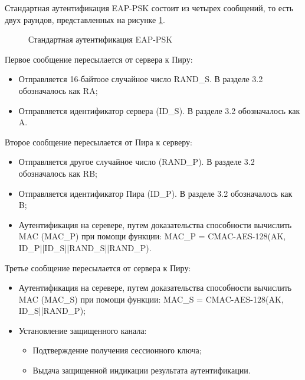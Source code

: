 Стандартная аутентификация EAP-PSK состоит из четырех сообщений, то есть двух раундов, представленных на рисунке \ref{img:standart_aut}.

\begin{figure}[h!]
\caption{Стандартная аутентификация EAP-PSK}
\label{img:standart_aut}
\end{figure}

Первое сообщение пересылается от сервера к Пиру:

\begin{itemize}
\item Отправляется 16-байтоое случайное число RAND\_S. В разделе 3.2 обозначалось как RA;
\item Отправляется идентификатор сервера (ID\_S). В разделе 3.2 обозначалось как A.
\end{itemize}

Второе сообщение пересылается от Пира к серверу:

\begin{itemize}
\item Отправляется другое случайное число (RAND\_P). В разделе 3.2 обозначалось как RB;
\item Отправляется идентификатор Пира (ID\_P). В разделе 3.2 обозначалось как B;
\item Аутентификация на серевере, путем доказательства способности вычислить MAC (MAC\_P) при помощи функции: MAC\_P = CMAC-AES-128(AK, ID\_P||ID\_S||RAND\_S||RAND\_P).
\end{itemize}

Третье сообщение пересылается от сервера к Пиру:

\begin{itemize}
\item Аутентификация на серевере, путем доказательства способности вычислить MAC (MAC\_S) при помощи функции: MAC\_S = CMAC-AES-128(AK, ID\_S||RAND\_P);
\item Установление защищенного канала:
\begin{itemize}
\item Подтверждение получения сессионного ключа;
\item Выдача защищенной индикации результата аутентификации.
\end{itemize}
\end{itemize}

